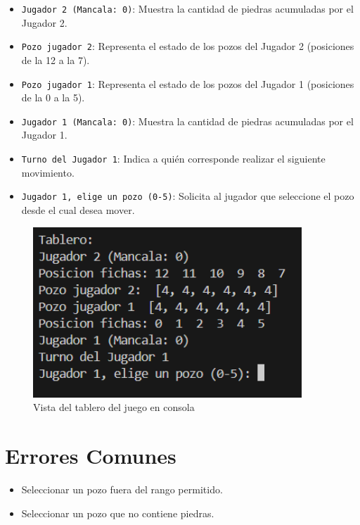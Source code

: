 \documentclass[12pt]{article}
\begin{document}
\begin{itemize}
    \item \texttt{Jugador 2 (Mancala: 0)}: Muestra la cantidad de piedras acumuladas por el Jugador 2.
    \item \texttt{Pozo jugador 2}: Representa el estado de los pozos del Jugador 2 (posiciones de la 12 a la 7).
    \item \texttt{Pozo jugador 1}: Representa el estado de los pozos del Jugador 1 (posiciones de la 0 a la 5).
    \item \texttt{Jugador 1 (Mancala: 0)}: Muestra la cantidad de piedras acumuladas por el Jugador 1.
    \item \texttt{Turno del Jugador 1}: Indica a quién corresponde realizar el siguiente movimiento.
    \item \texttt{Jugador 1, elige un pozo (0-5)}: Solicita al jugador que seleccione el pozo desde el cual desea mover.
\end{itemize}

\begin{figure}[h!]
    \centering
    \includegraphics[width=0.9\textwidth]{Tablero.png}
    \caption{Vista del tablero del juego en consola}
    \label{fig:tablero}
\end{figure}

\section{Errores Comunes}

\begin{itemize}
    \item Seleccionar un pozo fuera del rango permitido.
    \item Seleccionar un pozo que no contiene piedras.
\end{itemize}
\end{document}
